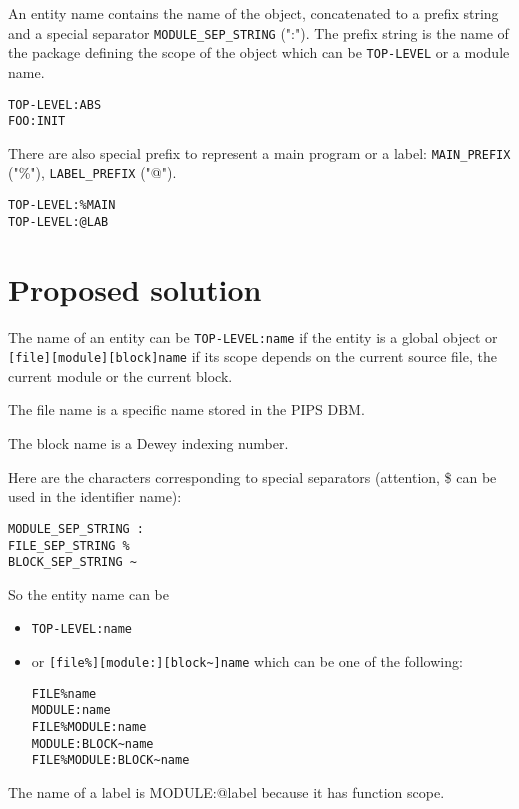 \documentclass[a4paper]{report}
\begin{document}
An entity name contains the name of the object, concatenated to a prefix
string and a special separator \verb/MODULE_SEP_STRING/ (":"). The prefix
string is the name of the package defining the scope of the object which
can be \verb/TOP-LEVEL/ or a module name. 
\begin{verbatim}
TOP-LEVEL:ABS
FOO:INIT
\end{verbatim}  
There are also special prefix to represent a main program or a label:
\verb/MAIN_PREFIX/ ("\%"), \verb/LABEL_PREFIX/ ("@").
\begin{verbatim}
TOP-LEVEL:%MAIN
TOP-LEVEL:@LAB
\end{verbatim}  

\section{Proposed solution}

The name of an entity can be \verb/TOP-LEVEL:name/ if the entity is a
global object or  
\verb/[file][module][block]name/ if its scope depends on the current source file,
the current module or the current block. 

The file name is a specific name stored in the PIPS DBM. 

The block name is a Dewey indexing number. 

Here are the characters corresponding to special separators (attention, \$
can be used in the identifier name): 
\begin{verbatim}
MODULE_SEP_STRING :
FILE_SEP_STRING %
BLOCK_SEP_STRING ~
\end{verbatim}  

So the entity name can be 
\begin{itemize}
\item 
\verb/TOP-LEVEL:name/
\item or 
\verb/[file%][module:][block~]name/ which can be one of the following: 
\begin{verbatim}
FILE%name
MODULE:name
FILE%MODULE:name
MODULE:BLOCK~name
FILE%MODULE:BLOCK~name
\end{verbatim}  
\end{itemize} 
The name of a label is MODULE:@label because it has function scope. 
\end{document}
